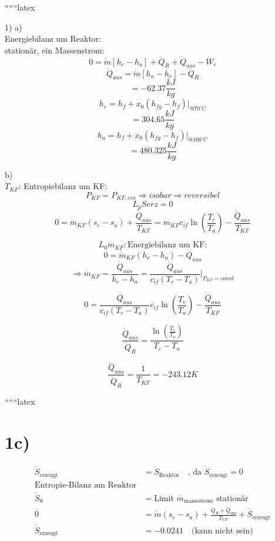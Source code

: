 
``````latex


1) a) \\
Energiebilanz um Reaktor: \\
stationär, ein Massenstrom: \\
\[
0 = \dot{m} [h_e - h_a] + \dot{Q}_R + \dot{Q}_{aus} - \dot{W}_e
\]
\[
\dot{Q}_{aus} = \dot{m} [h_a - h_e] - \dot{Q}_R
\]
\[
= -62.37 \frac{kJ}{kg}
\]
\[
h_e = h_f + x_0 (h_{fg} - h_f) \bigg|_{@70^\circ C}
\]
\[
= 304.65 \frac{kJ}{kg}
\]
\[
h_a = h_f + x_0 (h_{fg} - h_f) \bigg|_{@100^\circ C}
\]
\[
= 480.325 \frac{kJ}{kg}
\]

b) \\
\(\dot{T}_{KF}\): Entropiebilanz um KF: \\
\[
P_{KF} = P_{KF,ein} \Rightarrow isobar \Rightarrow reversibel
\]
\[
L_p Serz = 0
\]
\[
0 = \dot{m}_{KF} (s_e - s_a) + \frac{\dot{Q}_{aus}}{T_{KF}} = \dot{m}_{KF} c_{if} \ln \left( \frac{T_e}{T_a} \right) - \frac{\dot{Q}_{aus}}{T_{KF}}
\]

\[
L_0 \dot{m}_{KF}: \text{Energiebilanz um KF:}
\]
\[
0 = \dot{m}_{KF} (h_e - h_a) - \dot{Q}_{aus}
\]
\[
\Rightarrow \dot{m}_{KF} = \frac{\dot{Q}_{aus}}{h_e - h_a} = \frac{\dot{Q}_{aus}}{c_{if} (T_e - T_a)} \bigg|_{P_{KF} = const}
\]

\[
0 = \frac{\dot{Q}_{aus}}{c_{if} (T_e - T_a)} c_{if} \ln \left( \frac{T_e}{T_a} \right) - \frac{\dot{Q}_{aus}}{T_{KF}}
\]

\[
\frac{\dot{Q}_{aus}}{\dot{Q}_R} = \frac{\ln \left( \frac{T_e}{T_a} \right)}{T_e - T_a}
\]

\[
\frac{\dot{Q}_{aus}}{\dot{Q}_R} = \frac{1}{T_{KF}} = -243.12 K
\]

``````latex

\section*{1c)}

\begin{align*}
\dot{S}_{\text{erzeugt}} &= \dot{S}_{\text{Reaktor}} \quad \text{, da } \dot{S}_{\text{erzeugt}} = 0 \\
\text{Entropie-Bilanz am Reaktor} \\
\dot{S}_{0} &= \text{Limit } \dot{m}_{\text{massestrom}} \text{ stationär} \\
0 &= \dot{m} (s_e - s_a) + \frac{\dot{Q}_R + \dot{Q}_{\text{um}}}{T_{\text{UF}}} + \dot{S}_{\text{erzeugt}} \\
\dot{S}_{\text{erzeugt}} &= -0.0241 \quad \text{(kann nicht sein)} \\
\end{align*}

